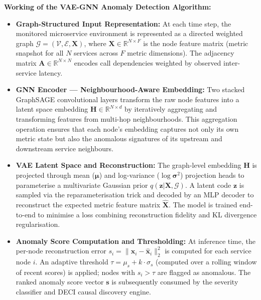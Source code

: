 \hspace*{0.3in} \textbf{Working of the VAE-GNN Anomaly Detection Algorithm:}

\begin{itemize}
    \item \textbf{Graph-Structured Input Representation:} At each time step, the monitored microservice environment is represented as a directed weighted graph $\mathcal{G} = (\mathcal{V}, \mathcal{E}, \mathbf{X})$, where $\mathbf{X} \in \mathbb{R}^{N \times F}$ is the node feature matrix (metric snapshot for all $N$ services across $F$ metric dimensions). The adjacency matrix $\mathbf{A} \in \mathbb{R}^{N \times N}$ encodes call dependencies weighted by observed inter-service latency.

    \item \textbf{GNN Encoder — Neighbourhood-Aware Embedding:} Two stacked GraphSAGE convolutional layers transform the raw node features into a latent space embedding $\mathbf{H} \in \mathbb{R}^{N \times d}$ by iteratively aggregating and transforming features from multi-hop neighbourhoods. This aggregation operation ensures that each node's embedding captures not only its own metric state but also the anomalous signatures of its upstream and downstream service neighbours.

    \item \textbf{VAE Latent Space and Reconstruction:} The graph-level embedding $\mathbf{H}$ is projected through mean ($\boldsymbol{\mu}$) and log-variance ($\log\boldsymbol{\sigma}^2$) projection heads to parameterise a multivariate Gaussian prior $q(\mathbf{z} | \mathbf{X}, \mathcal{G})$. A latent code $\mathbf{z}$ is sampled via the reparameterisation trick and decoded by an MLP decoder to reconstruct the expected metric feature matrix $\hat{\mathbf{X}}$. The model is trained end-to-end to minimise a loss combining reconstruction fidelity and KL divergence regularisation.

    \item \textbf{Anomaly Score Computation and Thresholding:} At inference time, the per-node reconstruction error $s_i = \|\mathbf{x}_i - \hat{\mathbf{x}}_i\|_2^2$ is computed for each service node $i$. An adaptive threshold $\tau = \mu_s + k \cdot \sigma_s$ (computed over a rolling window of recent scores) is applied; nodes with $s_i > \tau$ are flagged as anomalous. The ranked anomaly score vector $\mathbf{s}$ is subsequently consumed by the severity classifier and DECI causal discovery engine.
\end{itemize}

